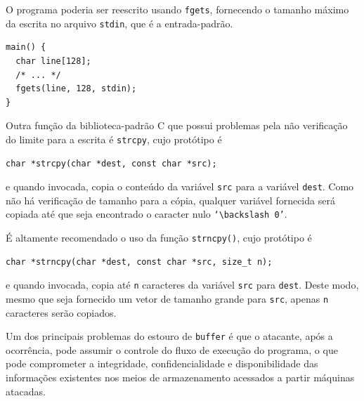 \begin{frame}[fragile]{}

O programa poderia ser reescrito usando {\tt fgets}, fornecendo o
tamanho máximo da escrita no arquivo {\tt stdin}, que é a
entrada-padrão.

\begin{lstlisting}
main() {
  char line[128];
  /* ... */
  fgets(line, 128, stdin);
}
\end{lstlisting}

\end{frame}

\begin{frame}[fragile]{}

Outra função da biblioteca-padrão C que possui problemas pela não verificação 
do limite para a escrita é {\tt strcpy}, cujo protótipo é

\begin{lstlisting}
char *strcpy(char *dest, const char *src);
\end{lstlisting}

e quando invocada, copia o conteúdo da variável {\tt src}
para a variável {\tt dest}. Como não há verificação de tamanho para a
cópia, qualquer variável fornecida será copiada até que seja
encontrado o caracter nulo {\tt `$\backslash 0$'}.

\end{frame}



\begin{frame}[fragile]{}

É altamente recomendado o uso da função {\tt strncpy()}, cujo 
protótipo é

\begin{lstlisting}
char *strncpy(char *dest, const char *src, size_t n);
\end{lstlisting}

e quando invocada, copia até {\tt n} caracteres da variável {\tt src} para
{\tt dest}. Deste modo, mesmo que seja fornecido um vetor de tamanho
grande para {\tt src}, apenas {\tt n} caracteres serão copiados.

\end{frame}

\begin{frame}[fragile]{}

Um dos principais problemas do estouro de {\tt buffer} é que o atacante,
após a ocorrência, pode assumir o controle do fluxo de execução do
programa, o que pode comprometer a integridade, confidencialidade e
disponibilidade das informações existentes nos meios de armazenamento
acessados a partir máquinas atacadas.

\end{frame}

